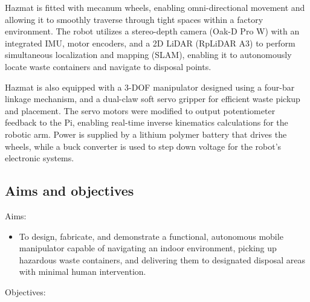 \documentclass{article}
\begin{document}
Hazmat is fitted with mecanum wheels, enabling omni-directional movement and allowing it to smoothly traverse through tight spaces within a factory environment. The robot utilizes a stereo-depth camera (Oak-D Pro W) with an integrated IMU, motor encoders, and a 2D LiDAR (RpLiDAR A3) to perform simultaneous localization and mapping (SLAM), enabling it to autonomously locate waste containers and navigate to disposal points. 

Hazmat is also equipped with a 3-DOF manipulator designed using a four-bar linkage mechanism, and a dual-claw soft servo gripper for efficient waste pickup and placement. The servo motors were modified to output potentiometer feedback to the Pi, enabling real-time inverse kinematics calculations for the robotic arm. Power is supplied by a lithium polymer battery that drives the wheels, while a buck converter is used to step down voltage for the robot's electronic systems. 

\subsection{Aims and objectives}

Aims:

\begin{itemize}

    \item To design, fabricate, and demonstrate a functional, autonomous mobile manipulator capable of navigating an indoor environment, picking up hazardous waste containers, and delivering them to designated disposal areas with minimal human intervention. 

\end{itemize}

Objectives:
\end{document}
